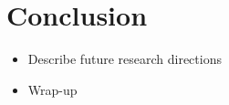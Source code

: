 \section{Conclusion}
\label{sec:conclusion}

\begin{itemize}
    \item Describe future research directions
    \item Wrap-up
\end{itemize}